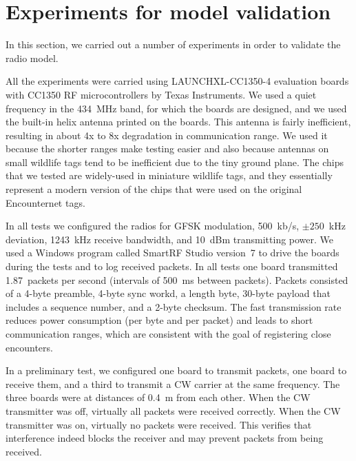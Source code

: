 \section{Experiments for model validation}
\label{experiments}

In this section, we carried out a number of experiments in order to validate the radio model. 

All the experiments were carried using LAUNCHXL-CC1350-4 evaluation boards with CC1350 RF microcontrollers 
by Texas Instruments. We used a quiet frequency in the 434~MHz band, for which the boards are designed,
and we used the built-in helix antenna printed on the boards. This antenna is fairly inefficient, resulting
in about 4x to 8x degradation in communication range. We used it because the shorter 
ranges make testing easier
and also because antennas on small wildlife tags tend to be inefficient due to the tiny ground plane.
The chips that we tested are widely-used in miniature wildlife tags, and they essentially represent a modern
version of the chips that were used on the original Encounternet tags.

In all tests we configured the radios for GFSK modulation, 500~kb/s, $\pm 250$~kHz deviation, 1243~kHz receive bandwidth,
and 10~dBm transmitting power. We used a Windows program called SmartRF Studio version~7 to drive the boards during
the tests and to log received packets. In all tests one board transmitted  1.87~packets per second (intervals of
500~ms between packets). Packets consisted of a 4-byte preamble, 4-byte sync workd, a length byte, 30-byte payload 
that includes a sequence number, and a 2-byte checksum. The fast transmission rate reduces power consumption (per byte and
per packet) and leads to short communication ranges, which are consistent with the goal of registering close encounters.

In a preliminary test, we configured one board to transmit packets, one board to receive them, and a third to transmit a 
CW carrier at the same frequency. The three boards were at distances of 0.4~m from each other. When the CW transmitter
was off, virtually all packets were received correctly. When the CW transmitter was on, virtually no packets were received.
This verifies that interference indeed blocks the receiver and may prevent packets from being received.


